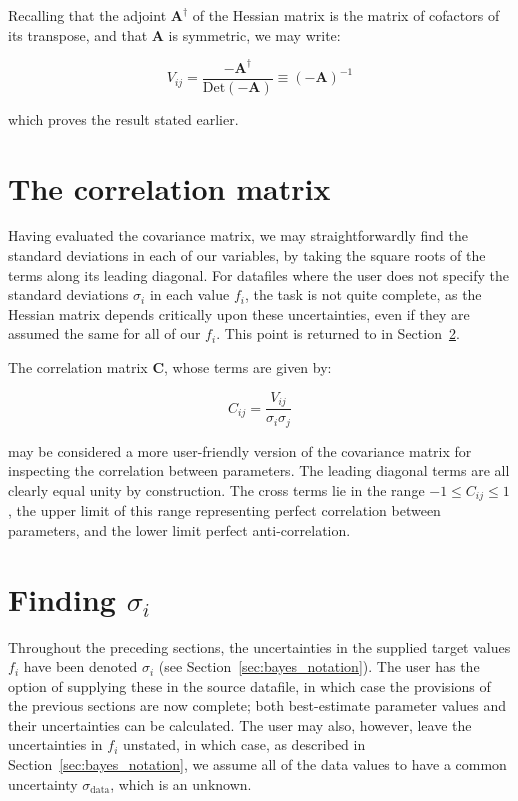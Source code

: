 Recalling that the adjoint $\mathbf{A}^\dagger$ of the Hessian matrix is the
matrix of cofactors of its transpose, and that $\mathbf{A}$ is symmetric, we
may write:

\begin{equation}
V_{ij} = \frac{-\mathbf{A}^\dagger}{\mathrm{Det}(\mathbf{-A})} \equiv (-\mathbf{A})^{-1}
\end{equation}

\noindent which proves the result stated earlier.

\section{The correlation matrix}
\label{sec:correlation_matrix}

Having evaluated the covariance matrix, we may straightforwardly find the
standard deviations in each of our variables, by taking the square roots of the
terms along its leading diagonal. For datafiles where the user does not specify
the standard deviations $\sigma_i$ in each value $f_i$, the task is not quite
complete, as the Hessian matrix depends critically upon these uncertainties,
even if they are assumed the same for all of our $f_i$. This point is returned
to in Section~\ref{sec:finding_sigmai}.

The correlation matrix $\mathbf{C}$, whose terms are given by:

\begin{equation}
C_{ij} = \frac{V_{ij}}{\sigma_i\sigma_j}
\end{equation}

\noindent may be considered a more user-friendly version of the covariance
matrix for inspecting the correlation between parameters. The leading diagonal
terms are all clearly equal unity by construction. The cross terms lie in the
range $-1 \leq C_{ij} \leq 1$, the upper limit of this range representing
perfect correlation between parameters, and the lower limit perfect
anti-correlation.

\section{Finding $\sigma_i$}
\label{sec:finding_sigmai}

Throughout the preceding sections, the uncertainties in the supplied target
values $f_i$ have been denoted $\sigma_i$ (see
Section~\ref{sec:bayes_notation}).  The user has the option of supplying these
in the source datafile, in which case the provisions of the previous sections
are now complete; both best-estimate parameter values and their uncertainties
can be calculated. The user may also, however, leave the uncertainties in $f_i$
unstated, in which case, as described in Section~\ref{sec:bayes_notation}, we
assume all of the data values to have a common uncertainty
$\sigma_\mathrm{data}$, which is an unknown.

